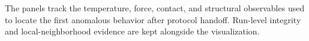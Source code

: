 The panels track the temperature, force, contact, and structural observables used to locate the first anomalous behavior after protocol handoff. Run-level integrity and local-neighborhood evidence are kept alongside the visualization.
